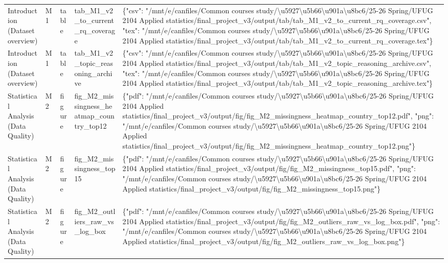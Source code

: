 \begin{tabular}{lllll}
Introduction (Dataset overview) & M1 & table & tab\_M1\_v2\_to\_current\_rq\_coverage & \{"csv": "/mnt/e/canfiles/Common courses study/\textbackslash u5927\textbackslash u5b66\textbackslash u901a\textbackslash u8bc6/25-26 Spring/UFUG 2104 Applied statistics/final\_project\_v3/output/tab/tab\_M1\_v2\_to\_current\_rq\_coverage.csv", "tex": "/mnt/e/canfiles/Common courses study/\textbackslash u5927\textbackslash u5b66\textbackslash u901a\textbackslash u8bc6/25-26 Spring/UFUG 2104 Applied statistics/final\_project\_v3/output/tab/tab\_M1\_v2\_to\_current\_rq\_coverage.tex"\} \\
Introduction (Dataset overview) & M1 & table & tab\_M1\_v2\_topic\_reasoning\_archive & \{"csv": "/mnt/e/canfiles/Common courses study/\textbackslash u5927\textbackslash u5b66\textbackslash u901a\textbackslash u8bc6/25-26 Spring/UFUG 2104 Applied statistics/final\_project\_v3/output/tab/tab\_M1\_v2\_topic\_reasoning\_archive.csv", "tex": "/mnt/e/canfiles/Common courses study/\textbackslash u5927\textbackslash u5b66\textbackslash u901a\textbackslash u8bc6/25-26 Spring/UFUG 2104 Applied statistics/final\_project\_v3/output/tab/tab\_M1\_v2\_topic\_reasoning\_archive.tex"\} \\
Statistical Analysis (Data Quality) & M2 & figure & fig\_M2\_missingness\_heatmap\_country\_top12 & \{"pdf": "/mnt/e/canfiles/Common courses study/\textbackslash u5927\textbackslash u5b66\textbackslash u901a\textbackslash u8bc6/25-26 Spring/UFUG 2104 Applied statistics/final\_project\_v3/output/fig/fig\_M2\_missingness\_heatmap\_country\_top12.pdf", "png": "/mnt/e/canfiles/Common courses study/\textbackslash u5927\textbackslash u5b66\textbackslash u901a\textbackslash u8bc6/25-26 Spring/UFUG 2104 Applied statistics/final\_project\_v3/output/fig/fig\_M2\_missingness\_heatmap\_country\_top12.png"\} \\
Statistical Analysis (Data Quality) & M2 & figure & fig\_M2\_missingness\_top15 & \{"pdf": "/mnt/e/canfiles/Common courses study/\textbackslash u5927\textbackslash u5b66\textbackslash u901a\textbackslash u8bc6/25-26 Spring/UFUG 2104 Applied statistics/final\_project\_v3/output/fig/fig\_M2\_missingness\_top15.pdf", "png": "/mnt/e/canfiles/Common courses study/\textbackslash u5927\textbackslash u5b66\textbackslash u901a\textbackslash u8bc6/25-26 Spring/UFUG 2104 Applied statistics/final\_project\_v3/output/fig/fig\_M2\_missingness\_top15.png"\} \\
Statistical Analysis (Data Quality) & M2 & figure & fig\_M2\_outliers\_raw\_vs\_log\_box & \{"pdf": "/mnt/e/canfiles/Common courses study/\textbackslash u5927\textbackslash u5b66\textbackslash u901a\textbackslash u8bc6/25-26 Spring/UFUG 2104 Applied statistics/final\_project\_v3/output/fig/fig\_M2\_outliers\_raw\_vs\_log\_box.pdf", "png": "/mnt/e/canfiles/Common courses study/\textbackslash u5927\textbackslash u5b66\textbackslash u901a\textbackslash u8bc6/25-26 Spring/UFUG 2104 Applied statistics/final\_project\_v3/output/fig/fig\_M2\_outliers\_raw\_vs\_log\_box.png"\} \\

\end{tabular}
